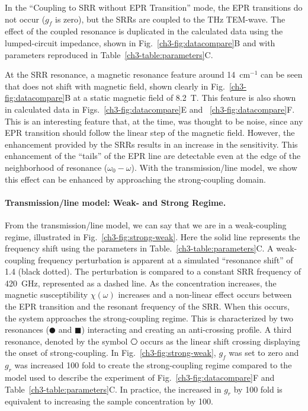 In the ``Coupling to SRR without EPR Transition'' mode, the EPR transitions do not occur ($g_f$ is zero), but the SRRs are coupled to the THz TEM-wave. The effect of the coupled resonance is duplicated in the calculated data using the lumped-circuit impedance, shown in Fig.~\ref{ch3-fig:datacompare}B and with parameters reproduced in Table~\ref{ch3-table:parameters}C. 

At the SRR resonance, a magnetic resonance feature around 14~cm$^{-1}$ can be seen that does not shift with magnetic field, shown clearly in Fig.~\ref{ch3-fig:datacompare}B at a static magnetic field of 8.2~T. This feature is also shown in calculated data in Figs.~\ref{ch3-fig:datacompare}E and ~\ref{ch3-fig:datacompare}F. This is an interesting feature that, at the time, was thought to be noise, since any EPR transition should follow the linear step of the magnetic field. However, the enhancement provided by the SRRs results in an increase in the sensitivity. This enhancement of the ``tails'' of the EPR line are detectable even at the edge of the neighborhood of resonance ($\omega_0-\omega$). With the transmission\-/line model, we show this effect can be enhanced by approaching the strong-coupling domain.

\noindent \paragraph*{Transmission\-/line model: Weak- and Strong Regime.} From the transmission\-/line model, we can say that we are in a weak-coupling regime, illustrated in Fig.~\ref{ch3-fig:strong-weak}. Here the solid line represents the frequency shift using the parameters in Table.~\ref{ch3-table:parameters}C. A weak-coupling frequency perturbation is apparent at a simulated ``resonance shift'' of 1.4 (black dotted). The perturbation is compared to a constant SRR frequency of 420~GHz, represented as a dashed line. As the concentration increases, the magnetic susceptibility $\chi(\omega)$ increases and a non-linear effect occurs between the EPR transition and the resonant frequency of the SRR. When this occurs, the system approaches the strong-coupling regime. This is characterized by two resonances ($\CIRCLE$ and $\blacksquare$) interacting and creating an anti-crossing profile. A third resonance, denoted by the symbol $\hexagon$ occurs as the linear shift crossing displaying the onset of strong-coupling. In Fig.~\ref{ch3-fig:strong-weak}, $g_f$ was set to zero and $g_r$ was increased 100 fold to create the strong-coupling regime compared to the model used to describe the experiment of Fig.~\ref{ch3-fig:datacompare}F and Table~\ref{ch3-table:parameters}C. In practice, the increased in $g_r$ by 100 fold is equivalent to increasing the sample concentration by 100.

